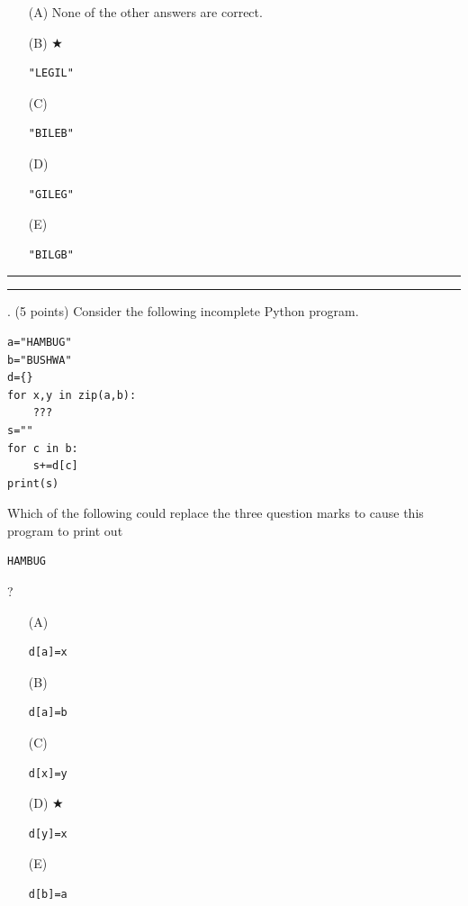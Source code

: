 \documentclass{article}
\newcounter{question}
\begin{document}
\begin{enumerate}
\item[(A)]
None of the other answers are correct.

\item[(B)] $\bigstar$ 
\begin{verbatim}"LEGIL"\end{verbatim}

\item[(C)]
\begin{verbatim}"BILEB"\end{verbatim}

\item[(D)]
\begin{verbatim}"GILEG"\end{verbatim}

\item[(E)]
\begin{verbatim}"BILGB"\end{verbatim}

\end{enumerate}

\vspace*{2em}
\hrule
\vspace{2em}

\vspace{2em}
\hrule height 2pt


\newpage
{}. (5 points)
Consider the following incomplete Python program.
\begin{verbatim}
a="HAMBUG"
b="BUSHWA"
d={}
for x,y in zip(a,b):
    ???
s=""
for c in b:
    s+=d[c]
print(s)
\end{verbatim}
Which of the following could replace the three question marks to cause this program to print out  \begin{verbatim}HAMBUG\end{verbatim}?


\begin{enumerate}
\item[(A)]
\begin{verbatim}d[a]=x\end{verbatim}

\item[(B)]
\begin{verbatim}d[a]=b\end{verbatim}

\item[(C)]
\begin{verbatim}d[x]=y\end{verbatim}

\item[(D)] $\bigstar$ 
\begin{verbatim}d[y]=x\end{verbatim}

\item[(E)]
\begin{verbatim}d[b]=a\end{verbatim}

\end{enumerate}
\end{document}
